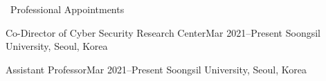 \documentclass{resume} %
\begin{document}
\begin{rSection}{\faGenderless~Professional Appointments}

	\begin{rSubsection2}
		{Co-Director of Cyber Security Research Center}{Mar 2021--Present}
		{Soongsil University, Seoul, Korea}{}
	\end{rSubsection2}
	\vspace{-2mm}
	\begin{rSubsection2}
		{Assistant Professor}{Mar 2021--Present}
		{Soongsil University, Seoul, Korea}{}
	\end{rSubsection2}
\end{rSection}





\end{document}
